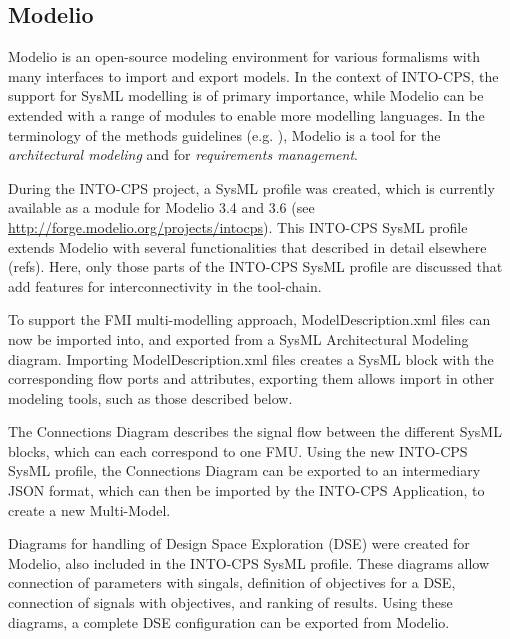 \subsection{Modelio}
\label{sec:modelio}
Modelio is an open-source modeling environment for various formalisms with many interfaces to import and export models. In the context of INTO-CPS, the support for SysML modelling is of primary importance, while Modelio can be extended with a range of modules to enable more modelling languages. In the terminology of the methods guidelines (e.g. \cite{INTOCPSD3.3a}), Modelio is a tool for the \textit{architectural modeling} and for \textit{requirements management}.

During the INTO-CPS project, a SysML profile was created, which is currently available as a module for Modelio 3.4 and 3.6 (see \url{http://forge.modelio.org/projects/intocps}). This INTO-CPS SysML profile extends Modelio with several functionalities that described in detail elsewhere (refs). Here, only those parts of the INTO-CPS SysML profile are discussed that add features for interconnectivity in the tool-chain.

To support the FMI multi-modelling approach, ModelDescription.xml files can now be imported into, and exported from a SysML Architectural Modeling diagram. Importing ModelDescription.xml files creates a SysML block with the corresponding flow ports and attributes, exporting them allows import in other modeling tools, such as those described below.

The Connections Diagram describes the signal flow between the different SysML blocks, which can each correspond to one FMU. Using the new INTO-CPS SysML profile, the Connections Diagram can be exported to an intermediary JSON format, which can then be imported by the INTO-CPS Application, to create a new Multi-Model.


Diagrams for handling of Design Space Exploration (DSE) were created for Modelio, also included in the INTO-CPS SysML profile. These diagrams allow connection of parameters with singals, definition of objectives for a DSE, connection of signals with objectives, and ranking of results. Using these diagrams, a complete DSE configuration can be exported from Modelio.

